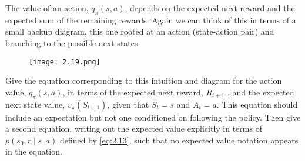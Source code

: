
\begin{exercise}[Exercise 3.19]

The value of an action, $q_\pi(s, a)$, depends on the expected next reward and the expected sum of the remaining rewards.
Again we can think of this in terms of a small backup diagram, this one rooted at an action (state-action pair) and branching to the possible next states:

\begin{figure}[H]
    \centering
    \texttt{[image: 2.19.png]}
    \caption{}
    \label{fig:2.19}
\end{figure}

Give the equation corresponding to this intuition and diagram for the action value, $q_\pi(s, a)$, in terms of the expected next reward, $R_{t+1}$ , and the expected next state value, $v_\pi(S_{t+1})$, given that $S_t = s$ and $A_t = a$.
This equation should include an expectation but not one conditioned on following the policy.
Then give a second equation, writing out the expected value explicitly in terms of $p(s_0, r \mid s, a)$ defined by \eqref{eq:2.13}, such that no expected value notation appears in the equation.

\end{exercise}


